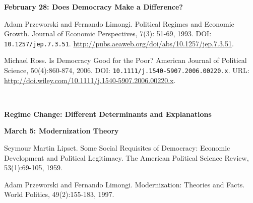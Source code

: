 \documentclass[letterpaper]{article}
\renewenvironment{itemize}{
  \begin{list}{}{
    \setlength{\leftmargin}{1.5em}
  }
}{
  \end{list}
}
\begin{document}
\begin{enumerate}
	\begin{itemize} 
		\item {\bf February 28: Does Democracy Make a Difference?}
			\begin{itemize} 
				\item[$\bullet$] Adam Przeworski and Fernando Limongi. Political Regimes and Economic Growth. Journal of Economic Perspectives, 7(3): 51-69, 1993. DOI: \texttt{10.1257/jep.7.3.51}. \url{http://pubs.aeaweb.org/doi/abs/10.1257/jep.7.3.51}.
				\item[$\bullet$] Michael Ross. Is Democracy Good for the Poor? American Journal of Political Science, 50(4):860-874,  2006. DOI: \texttt{10.1111/j.1540-5907.2006.00220.x}. URL: \url{http://doi.wiley.com/10.1111/j.1540-5907.2006.00220.x}.
			\end{itemize}
	\end{itemize}


\vspace{2mm}\\
\vspace{2mm}


\item {\bf Regime Change: Different Determinants and Explanations}
	\begin{itemize} {\bf March 5: Modernization Theory}
				\begin{itemize}
					\item[$\bullet$] Seymour Martin Lipset. Some Social Requisites of Democracy: Economic Development and Political Legitimacy. The American Political Science Review, 53(1):69-105, 1959.
					\item[$\bullet$] Adam Przeworski and Fernando Limongi. Modernization: Theories and Facts. World Politics, 49(2):155-183, 1997.
				\end{itemize}


\end{itemize}
\end{enumerate}
\end{document}
